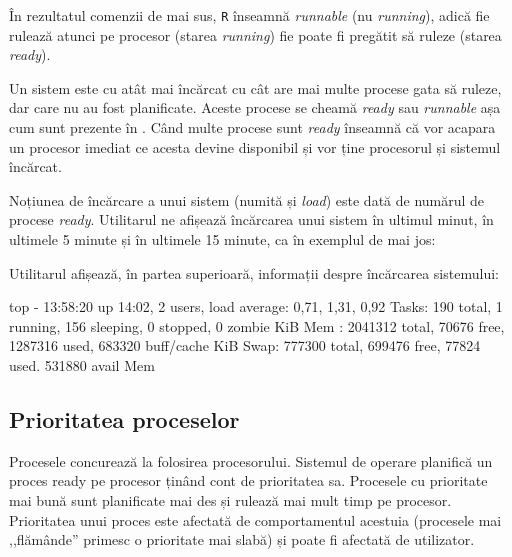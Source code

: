 În rezultatul comenzii  de mai sus, \texttt{R} înseamnă \textit{runnable} (nu \textit{running}), adică fie rulează
atunci pe procesor (starea \textit{running}) fie poate fi pregătit să ruleze (starea
\textit{ready}).

Un sistem este cu atât mai încărcat cu cât are mai multe procese gata să ruleze,
dar care nu au fost planificate. Aceste procese se cheamă \textit{ready} sau \textit{runnable} așa
cum sunt prezente în . Când multe procese sunt \textit{ready} înseamnă
că vor acapara un procesor imediat ce acesta devine disponibil și vor ține
procesorul și sistemul încărcat.

Noțiunea de încărcare a unui sistem (numită și \textit{load}) este dată de numărul de
procese \textit{ready}. Utilitarul  ne afișează încărcarea unui sistem în ultimul
minut, în ultimele 5 minute și în ultimele 15 minute, ca în exemplul de mai jos:


Utilitarul  afișează, în partea superioară, informații despre încărcarea
sistemului:

\begin{screen}
top - 13:58:20 up 14:02,  2 users,  load average: 0,71, 1,31, 0,92
Tasks: 190 total,   1 running, 156 sleeping,   0 stopped,   0 zombie
KiB Mem :  2041312 total,    70676 free,  1287316 used,   683320 buff/cache
KiB Swap:   777300 total,   699476 free,    77824 used.   531880 avail Mem
\end{screen}

\subsection{Prioritatea proceselor}
\label{sec:procese-resurse-prioritate}

Procesele concurează la folosirea procesorului. Sistemul de operare planifică un
proces ready pe procesor ținând cont de prioritatea sa. Procesele cu prioritate
mai bună sunt planificate mai des și rulează mai mult timp pe procesor.
Prioritatea unui proces este afectată de comportamentul acestuia (procesele mai
,,flămânde'' primesc o prioritate mai slabă) și poate fi afectată de utilizator.

